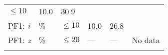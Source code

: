 \documentclass[DM,lsstdraft,toc]{lsstdoc}
\begin{document}
\begin{longtable}[]{@{}llllll@{}}
\begin{minipage}[t]{0.17\columnwidth}
\(\leq 10\)\strut
\end{minipage} & \begin{minipage}[t]{0.17\columnwidth}\raggedright\strut
10.0\strut
\end{minipage} & \begin{minipage}[t]{0.12\columnwidth}\raggedright\strut
30.9\strut
\end{minipage} & \begin{minipage}[t]{0.17\columnwidth}\raggedright\strut
\strut
\end{minipage}\tabularnewline
\begin{minipage}[t]{0.14\columnwidth}\raggedright\strut
PF1: \emph{i}\strut
\end{minipage} & \begin{minipage}[t]{0.06\columnwidth}\raggedright\strut
\%\strut
\end{minipage} & \begin{minipage}[t]{0.17\columnwidth}\raggedright\strut
\(\leq 10\)\strut
\end{minipage} & \begin{minipage}[t]{0.17\columnwidth}\raggedright\strut
10.0\strut
\end{minipage} & \begin{minipage}[t]{0.12\columnwidth}\raggedright\strut
26.8\strut
\end{minipage} & \begin{minipage}[t]{0.17\columnwidth}\raggedright\strut
\strut
\end{minipage}\tabularnewline
\begin{minipage}[t]{0.14\columnwidth}\raggedright\strut
PF1: \emph{z}\strut
\end{minipage} & \begin{minipage}[t]{0.06\columnwidth}\raggedright\strut
\%\strut
\end{minipage} & \begin{minipage}[t]{0.17\columnwidth}\raggedright\strut
\(\leq 20\)\strut
\end{minipage} & \begin{minipage}[t]{0.17\columnwidth}\raggedright\strut
---\strut
\end{minipage} & \begin{minipage}[t]{0.12\columnwidth}\raggedright\strut
---\strut
\end{minipage} & \begin{minipage}[t]{0.17\columnwidth}\raggedright\strut
No data\strut
\end{minipage}\tabularnewline
\begin{minipage}[t]{0.14\columnwidth}\raggedright\strut

\end{minipage}
\end{longtable}
\end{document}
